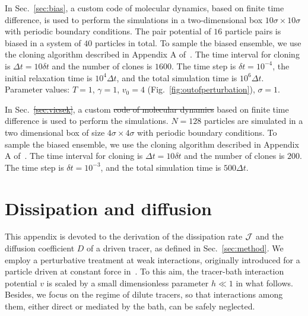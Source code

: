 \documentclass[superscriptaddress, twocolumn, prx, longbibliography, nofootinbib]{revtex4-1}
\providecommand{\DIFaddtex}[1]{{\protect\color{blue}\uwave{#1}}} %
\providecommand{\DIFdeltex}[1]{{\protect\color{red}\sout{#1}}}                      %
\providecommand{\DIFaddbegin}{} %
\providecommand{\DIFaddend}{} %
\providecommand{\DIFdelbegin}{} %
\providecommand{\DIFdelend}{} %
\providecommand{\DIFadd}[1]{\texorpdfstring{\DIFaddtex{#1}}{#1}} %
\providecommand{\DIFdel}[1]{\texorpdfstring{\DIFdeltex{#1}}{}} %
\begin{document}
In Sec.~\ref{sec:bias}, a custom code of molecular dynamics, based on finite time difference, is used to perform the simulations in a two-dimensional box $10\sigma\times 10\sigma$ with periodic boundary conditions. The pair potential of $16$ particle pairs is biased in a system of $40$ particles in total. To sample the biased ensemble, we use the cloning algorithm described in Appendix A of~\cite{Nemoto2016}. The time interval for cloning is $\Delta t = 10 \delta t$ and the number of clones is $1600$. The time step is $\delta t = 10^{-4}$, the initial relaxation time is $10^4\Delta t$, and the total simulation time is $10^6 \Delta t$. Parameter values: $T=1$, $\gamma=1$, $v_0=4$ (Fig.~\ref{fig:outofperturbation}), $\sigma=1$.

In Sec.~\DIFdelbegin \DIFdel{\ref{sec:vicsek}}\DIFdelend \DIFaddbegin \DIFadd{\ref{secsec:viscek}}\DIFaddend , a custom \DIFdelbegin \DIFdel{code of molecular dynamics }\DIFdelend \DIFaddbegin \DIFadd{molecular dynamics code }\DIFaddend based on finite time difference is used to perform the simulations. $N=128$ particles are simulated in a two dimensional box of size $4\sigma\times 4\sigma$ with periodic boundary conditions. To sample the biased ensemble, we use the cloning algorithm described in Appendix A of~\cite{Nemoto2016}. The time interval for cloning is $\Delta t = 10 \delta t$ and the number of clones is $200$. The time step is $\delta t = 10^{-3}$, and the total simulation time is $500 \Delta t$. 



\section{Dissipation and diffusion}\label{app:diff}

This appendix is devoted to the derivation of the dissipation rate $\cal J$ and the diffusion coefficient $D$ of a driven tracer, as defined in Sec.~\ref{sec:method}. We employ a perturbative treatment at weak interactions, originally introduced for a particle driven at constant force in~\cite{Demery2011, Demery2014}. To this aim, the tracer-bath interaction potential $v$ is scaled by a small dimensionless parameter $h\ll1$ in what follows. Besides, we focus on the regime of dilute tracers, so that interactions among them, either direct or mediated by the bath, can be safely neglected.
\end{document}

